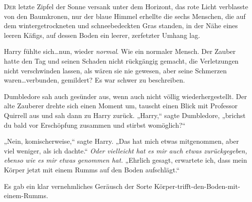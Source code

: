
\lettrine{D}{er} letzte Zipfel der Sonne versank unter dem Horizont, das rote Licht verblasste von den Baumkronen, nur der blaue Himmel erhellte die sechs Menschen, die auf dem wintergetrockneten und schneebedeckten Gras standen, in der Nähe eines leeren Käfigs, auf dessen Boden ein leerer, zerfetzter Umhang lag.

Harry fühlte sich…nun, wieder \emph{normal}. Wie ein normaler Mensch. Der Zauber hatte den Tag und seinen Schaden nicht rückgängig gemacht, die Verletzungen nicht verschwinden lassen, als wären sie nie gewesen, aber seine Schmerzen waren…verbunden, gemildert? Es war schwer zu beschreiben.

Dumbledore sah auch gesünder aus, wenn auch nicht völlig wiederhergestellt. Der alte Zauberer drehte sich einen Moment um, tauscht einen Blick mit Professor Quirrell aus und sah dann zu Harry zurück. „Harry,“ sagte Dumbledore, „brichst du bald vor Erschöpfung zusammen und stirbst womöglich?“

„Nein, komischerweise,“ sagte Harry. „Das hat mich etwas mitgenommen, aber viel weniger, als ich dachte.“ \emph{Oder vielleicht hat es mir auch etwas zurückgegeben, ebenso wie es mir etwas genommen hat.} „Ehrlich gesagt, erwartete ich, dass mein Körper jetzt mit einem Rumms auf den Boden aufschlägt.“

Es gab ein klar vernehmliches Geräusch der Sorte Körper-trifft-den-Boden-mit-einem-Rumms.

